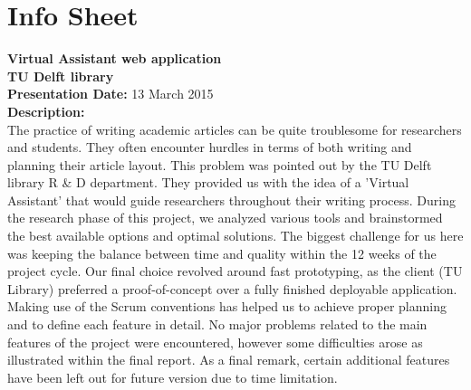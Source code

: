 \chapter{Info Sheet}    
\textbf{Virtual Assistant web application\\}
\textbf{\small{TU Delft library\\}}
\textbf{Presentation Date: } 13 March 2015\\ 
\bigskip
\textbf{Description: \\}
 The practice of writing academic articles can be quite troublesome for researchers and students. They often encounter hurdles in terms of both writing 
 and planning their article layout. This problem was pointed out by the TU Delft library R \& D department. They provided us with the idea of a 
 'Virtual Assistant' that would guide researchers throughout their writing process. During the research phase of this project, we analyzed various tools and brainstormed the best available options 
 and optimal solutions. The biggest challenge for us here was keeping the balance between time and quality within the 12 weeks of the project cycle. 
 Our final choice revolved around fast prototyping, as the client (TU Library) preferred a proof-of-concept over a fully finished deployable application. 
 Making use of the Scrum conventions has helped us to achieve proper planning and to define each feature in detail. No major problems related to the 
 main features of the project were encountered, however some difficulties arose as illustrated within the final report. As a final remark, certain 
 additional features have been left out for future version due to time limitation.\\


